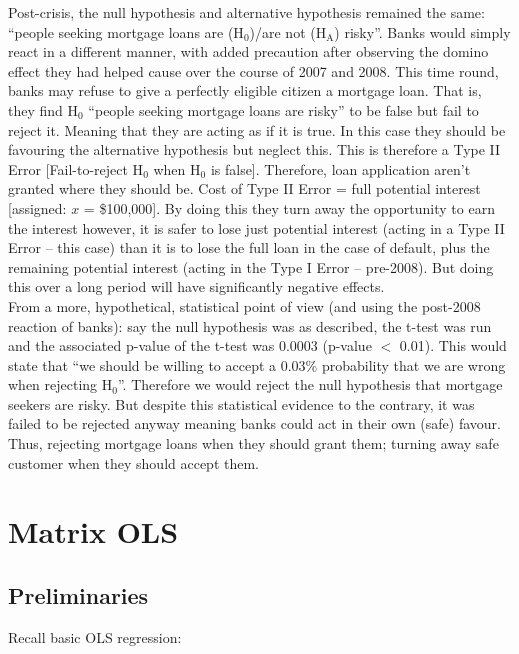 \documentclass[11pt, english]{article}
\begin{document}
	Post-crisis, the null hypothesis and alternative hypothesis remained the same: ``people seeking mortgage loans are (H$_0$)/are not (H$\mathrm{_A}$) risky''. Banks would simply react in a different manner, with added precaution after observing the domino effect they had helped cause over the course of 2007 and 2008. This time round, banks may refuse to give a perfectly eligible citizen a mortgage loan. That is, they find H$_0$ ``people seeking mortgage loans are risky'' to be false but fail to reject it. Meaning that they are acting as if it is true. In this case they should be favouring the alternative hypothesis but neglect this. This is therefore a Type II Error [Fail-to-reject H$_0$ when H$_0$ is false]. Therefore, loan application aren’t granted where they should be. Cost of Type II Error = full potential interest [assigned: $x$ = \$100,000]. By doing this they turn away the opportunity to earn the interest however, it is safer to lose just potential interest (acting in a Type II Error – this case) than it is to lose the full loan in the case of default, plus the remaining potential interest (acting in the Type I Error – pre-2008). But doing this over a long period will have significantly negative effects.\\

	From a more, hypothetical, statistical point of view (and using the post-2008 reaction of banks): say the null hypothesis was as described, the t-test was run and the associated p-value of the t-test was 0.0003 (p-value $<$ 0.01). This would state that ``we should be willing to accept a 0.03\% probability that we are wrong when rejecting H$_0$''. Therefore we would reject the null hypothesis that mortgage seekers are risky. But despite this statistical evidence to the contrary, it was failed to be rejected anyway meaning banks could act in their own (safe) favour. Thus, rejecting mortgage loans when they should grant them; turning away safe customer when they should accept them.

\newpage

\section{Matrix OLS}

	\subsection{Preliminaries}

	Recall basic OLS regression:
\end{document}
